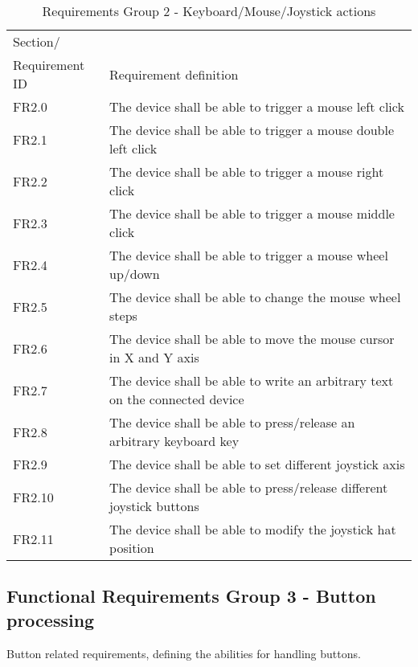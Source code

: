 \documentclass[]{scrreprt}%
\begin{document}
\begin{table}[htb!]
 \centering
 \caption{Requirements Group 2 - Keyboard/Mouse/Joystick actions}
\label{req_group2}
 \begin{tabularx}{\textwidth}{|l|X|} \hline
 Section/\\ Requirement ID & Requirement definition\\ \hline  \hline
 FR2.0 & The device shall be able to trigger a mouse left click\\ \hline
 FR2.1 & The device shall be able to trigger a mouse double left click\\ \hline
 FR2.2 & The device shall be able to trigger a mouse right click\\ \hline
 FR2.3 & The device shall be able to trigger a mouse middle click\\ \hline
 FR2.4 & The device shall be able to trigger a mouse wheel up/down\\ \hline
 FR2.5 & The device shall be able to change the mouse wheel steps\\ \hline
 FR2.6 & The device shall be able to move the mouse cursor in X and Y axis\\ \hline
 FR2.7 & The device shall be able to write an arbitrary text on the connected device \\ \hline
 FR2.8 & The device shall be able to press/release an arbitrary keyboard key\\ \hline
 FR2.9 & The device shall be able to set different joystick axis\\ \hline
 FR2.10 & The device shall be able to press/release different joystick buttons\\ \hline
 FR2.11 & The device shall be able to modify the joystick hat position\\ \hline
 \end{tabularx}
\end{table}

\subsection{Functional Requirements Group 3 - Button processing}

Button related requirements, defining the abilities for handling buttons.
\end{document}
